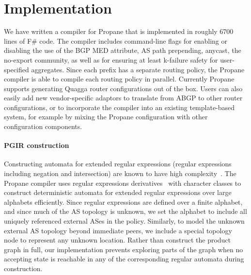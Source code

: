\documentclass[10pt]{sigalternate052015}
\newcommand{\sysname}{{\small \sf Propane}\xspace}
\newcommand{\para}[1]{\paragraph*{\textbf{#1}}}
\begin{document}
%
%
%
%

\section{Implementation}
\label{sec:implementation}

We have written a compiler for \sysname that is implemented in roughly 6700 lines of F\# code. The compiler includes command-line flags for enabling or disabling the use of the BGP MED attribute, AS path prepending, anycast, the no-export community, as well as for ensuring at least k-failure safety for user-specified aggregates. Since each prefix has a separate routing policy, the \sysname compiler is able to compile each routing policy in parallel. Currently \sysname supports generating Quagga router configurations out of the box. Users can also easily add new vendor-specific adaptors to translate from ABGP to other router configurations, or to incorporate the compiler into an existing template-based system, for example by mixing the \sysname configuration with other configuration components.

\para{PGIR construction}

Constructing automata for extended regular expressions (regular expressions including negation and intersection) are known to have high complexity~\cite{regex-complexity}. The \sysname compiler uses regular expressions derivatives~\cite{regex-derivatives} with character classes to construct deterministic automata for extended regular expressions over large alphabets efficiently. Since regular expressions are defined over a finite alphabet, and since much of the AS topology is unknown, we set the alphabet to include all uniquely referenced external ASes in the policy. Similarly, to model the unknown external AS topology beyond immediate peers, we include a special topology node to represent any unknown location.
%
Rather than construct the product graph in full, our implementation prevents exploring parts of the graph when no accepting state is reachable in any of the corresponding regular automata during construction.


\end{document}
